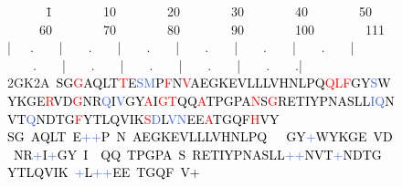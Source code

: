 \begin{figure}[p]
\begin{center}
{{\begin{minipage}{0.9\textwidth}
\begin{tiny}
\begin{tabbing}
\ \ \ \ \ \ \=1\ \ \ \ \ \ \ \ 10\ \ \ \ \ \ \ \ 20\ \ \ \ \ \ \ \ 30\ \ \ \ \ \ \ \ 40\ \ \ \ \ \ \ \ 50\ \ \ \ \ \ \ \ 60\ \ \ \ \ \ \ \ 70\ \ \ \ \ \ \ \ 80\ \ \ \ \ \ \ \ 90\ \ \ \ \ \ \ \ 100\ \ \ \ \ \ \ \ 111 \\
\>|\ \ \ .\ \ \ \ |\ \ \ \ .\ \ \ \ |\ \ \ \ .\ \ \ \ |\ \ \ \ .\ \ \ \ |\ \ \ \ .\ \ \ \ |\ \ \ \ .\ \ \ \ |\ \ \ \ .\ \ \ \ |\ \ \ \ .\ \ \ \ |\ \ \ \ .\ \ \ \ |\ \ \ \ .\ \ \ \ |\ \ \ \ .\ \ \ \ .| \\
2GK2A\ \textcolor{black}{SG}\textcolor{Red}{G}\textcolor{black}{AQLT}\textcolor{Red}{T}\textcolor{black}{E}\textcolor{RoyalBlue}{SM}\textcolor{black}{P}\textcolor{Red}{F}\textcolor{black}{N}\textcolor{Red}{V}\textcolor{black}{AEGKEVLLLVHNLPQ}\textcolor{Red}{QLF}\textcolor{black}{GY}\textcolor{RoyalBlue}{S}\textcolor{black}{WYKGE}\textcolor{Red}{R}\textcolor{black}{VD}\textcolor{Red}{G}\textcolor{black}{NR}\textcolor{RoyalBlue}{Q}\textcolor{black}{I}\textcolor{RoyalBlue}{V}\textcolor{black}{GY}\textcolor{Red}{A}\textcolor{black}{I}\textcolor{Red}{GT}\textcolor{black}{QQ}\textcolor{Red}{A}\textcolor{black}{TPGPA}\textcolor{Red}{N}\textcolor{black}{S}\textcolor{Red}{G}\textcolor{black}{RETIYPNASLL}\textcolor{RoyalBlue}{IQ}\textcolor{black}{NVT}\textcolor{RoyalBlue}{Q}\textcolor{black}{NDTG}\textcolor{Red}{F}\textcolor{black}{YTLQVIK}\textcolor{Red}{S}\textcolor{RoyalBlue}{D}\textcolor{black}{L}\textcolor{RoyalBlue}{VN}\textcolor{black}{EE}\textcolor{Red}{A}\textcolor{black}{TGQF}\textcolor{Red}{H}\textcolor{black}{VY}
\\
\>\textcolor{black}{SG}\textcolor{Red}{\ }\textcolor{black}{AQLT}\textcolor{Red}{\ }\textcolor{black}{E}\textcolor{RoyalBlue}{++}\textcolor{black}{P}\textcolor{Red}{\ }\textcolor{black}{N}\textcolor{Red}{\ }\textcolor{black}{AEGKEVLLLVHNLPQ}\textcolor{Red}{\ \ \ }\textcolor{black}{GY}\textcolor{RoyalBlue}{+}\textcolor{black}{WYKGE}\textcolor{Red}{\ }\textcolor{black}{VD}\textcolor{Red}{\ }\textcolor{black}{NR}\textcolor{RoyalBlue}{+}\textcolor{black}{I}\textcolor{RoyalBlue}{+}\textcolor{black}{GY}\textcolor{Red}{\ }\textcolor{black}{I}\textcolor{Red}{\ \ }\textcolor{black}{QQ}\textcolor{Red}{\ }\textcolor{black}{TPGPA}\textcolor{Red}{\ }\textcolor{black}{S}\textcolor{Red}{\ }\textcolor{black}{RETIYPNASLL}\textcolor{RoyalBlue}{++}\textcolor{black}{NVT}\textcolor{RoyalBlue}{+}\textcolor{black}{NDTG}\textcolor{Red}{\ }\textcolor{black}{YTLQVIK}\textcolor{Red}{\ }\textcolor{RoyalBlue}{+}\textcolor{black}{L}\textcolor{RoyalBlue}{++}\textcolor{black}{EE}\textcolor{Red}{\ }\textcolor{black}{TGQF}\textcolor{Red}{\ }\textcolor{black}{V+} \\

\end{tabbing}
\end{tiny}
\end{minipage}}}
\end{center}
\end{figure}
